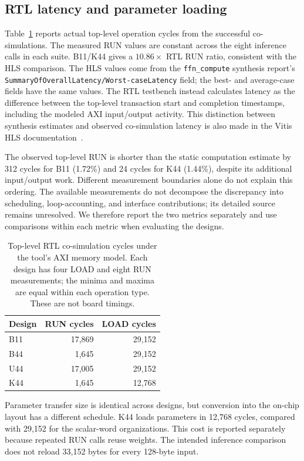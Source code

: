 \documentclass[11pt,letterpaper]{article}
\DeclareRobustCommand{\code}[1]{\nolinkurl{#1}}
\begin{document}
\subsection{RTL latency and parameter loading}
Table~\ref{tab:rtl} reports actual top-level operation cycles from the successful
co-simulations. The measured RUN values are constant across the eight inference
calls in each suite. B11/K44 gives a $10.86\times$ RTL RUN ratio, consistent with
the HLS comparison. The HLS values come from the \code{ffn_compute} synthesis
report's \code{SummaryOfOverallLatency/Worst-caseLatency} field; the best- and
average-case fields have the same values. The RTL testbench instead calculates
latency as the difference between the top-level transaction start and completion
timestamps, including the modeled AXI input/output activity. This distinction
between synthesis estimates and observed co-simulation latency is also made in
the Vitis HLS documentation~\cite{amdLatency}.

The observed top-level RUN is shorter than the static computation estimate by
312 cycles for B11 (1.72\%) and 24 cycles for K44 (1.44\%), despite its additional
input/output work. Different measurement boundaries alone do not explain this
ordering. The available measurements do not decompose the discrepancy into
scheduling, loop-accounting, and interface contributions; its detailed source
remains unresolved. We therefore report the two metrics separately and use
comparisons within each metric when evaluating the designs.

\begin{table}[tb]
\centering
\caption{Top-level RTL co-simulation cycles under the tool's AXI memory model.
Each design has four LOAD and eight RUN measurements; the minima and maxima
are equal within each operation type. These are not board timings.}
\label{tab:rtl}
\begin{tabular}{lrr}
\toprule
Design & RUN cycles & LOAD cycles\\
\midrule
B11 & 17,869 & 29,152\\
B44 & 1,645 & 29,152\\
U44 & 17,005 & 29,152\\
K44 & 1,645 & 12,768\\
\bottomrule
\end{tabular}
\end{table}

Parameter transfer size is identical across designs, but conversion into the
on-chip layout has a different schedule. K44 loads parameters in 12,768 cycles,
compared with 29,152 for the scalar-word organizations. This cost is reported
separately because repeated RUN calls reuse weights. The intended inference
comparison does not reload 33,152 bytes for every 128-byte input.
\end{document}
